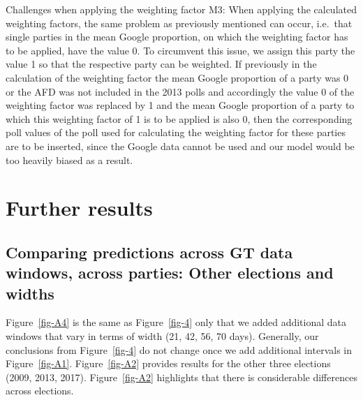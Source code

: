 \documentclass[
  letterpaper,
  DIV=11,
  numbers=noendperiod]{scrartcl}
\begin{document}
Challenges when applying the weighting factor M3: When applying the
calculated weighting factors, the same problem as previously mentioned
can occur, i.e.~that single parties in the mean Google proportion, on
which the weighting factor has to be applied, have the value 0. To
circumvent this issue, we assign this party the value 1 so that the
respective party can be weighted. If previously in the calculation of
the weighting factor the mean Google proportion of a party was 0 or the
AFD was not included in the 2013 polls and accordingly the value 0 of
the weighting factor was replaced by 1 and the mean Google proportion of
a party to which this weighting factor of 1 is to be applied is also 0,
then the corresponding poll values of the poll used for calculating the
weighting factor for these parties are to be inserted, since the Google
data cannot be used and our model would be too heavily biased as a
result.

\hypertarget{further-results}{%
\section{Further results}\label{further-results}}

\hypertarget{comparing-predictions-across-gt-data-windows-across-parties-other-elections-and-widths}{%
\subsection{Comparing predictions across GT data windows, across
parties: Other elections and
widths}\label{comparing-predictions-across-gt-data-windows-across-parties-other-elections-and-widths}}

Figure~\ref{fig-A4} is the same as Figure~\ref{fig-4} only that we added
additional data windows that vary in terms of width (21, 42, 56, 70
days). Generally, our conclusions from Figure~\ref{fig-4} do not change
once we add additional intervals in Figure~\ref{fig-A1}.
Figure~\ref{fig-A2} provides results for the other three elections
(2009, 2013, 2017). Figure~\ref{fig-A2} highlights that there is
considerable differences across elections.
\end{document}
